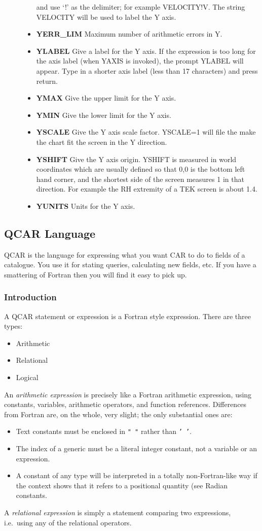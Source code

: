 \begin{description}
\begin{itemize}
and use `!' as the delimiter; for example VELOCITY!V.
The string VELOCITY will be used to label the Y axis.
\item{\bf YERR\_LIM} Maximum number of arithmetic errors in Y.
\item{\bf YLABEL} Give a label for the Y axis.
If the expression is too long for the axis label (when YAXIS is invoked),
the prompt YLABEL will appear.
Type in a shorter axis label (less than 17 characters) and press return.
\item{\bf YMAX} Give the upper limit for the Y axis.
\item{\bf YMIN} Give the lower limit for the Y axis.
\item{\bf YSCALE} Give the Y axis scale factor.
YSCALE=1 will file the make the chart fit the screen in the Y direction.
\item{\bf YSHIFT} Give the Y axis origin.
YSHIFT is measured in world coordinates which are usually defined so that
0,0 is the bottom left hand corner, and the shortest side of the screen
measures 1 in that direction.
For example the RH extremity of a TEK screen is about 1.4.
\item{\bf YUNITS} Units for the Y axis.
\end{itemize}
\end{description}

\subsection {QCAR Language}

QCAR is the language for expressing what you want CAR to do to fields of a
catalogue.
You use it for stating queries, calculating new fields, etc.
If you have a smattering of Fortran then you will find it easy to pick up.
\subsubsection {Introduction}
A QCAR statement or expression is a Fortran style expression.
There are  three types:
\begin{itemize}
\item Arithmetic
\item Relational
\item Logical
\end{itemize}
An {\em arithmetic expression} is precisely like a Fortran arithmetic
expression, using constants, variables, arithmetic operators, and function
references.
Differences from Fortran are, on the whole, very slight; the only substantial
ones are:
\begin{itemize}
\item Text constants must be enclosed in {\tt " "} rather than {\tt ' '}.
\item The index of a generic must be a literal integer constant, not
a variable or an expression.
\item A constant of any type will be interpreted in a totally non-Fortran-like
way if the context shows that it refers to a positional quantity (see Radian
constants.
\end{itemize}
A {\em relational expression} is simply a statement comparing two expressions,
i.e.\ using any of the relational operators.


